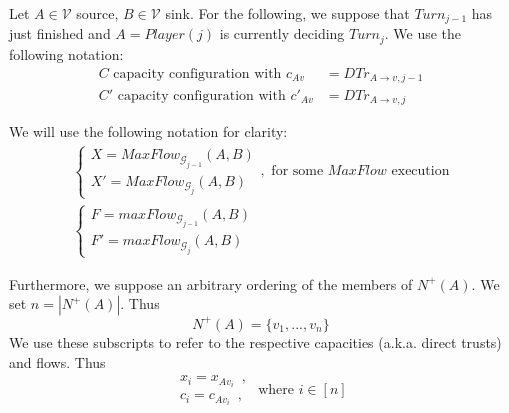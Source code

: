 Let $A \in \mathcal{V}$ source, $B \in \mathcal{V}$ sink. For the following, we suppose that $Turn_{j-1}$ has just finished
and $A = Player\left(j\right)$ is currently deciding $Turn_j$. We use the following notation:
\begin{align*}
   C \mbox{ capacity configuration with } c_{Av} &= DTr_{A \rightarrow v, j-1} \\
   C' \mbox{ capacity configuration with } c'_{Av} &= DTr_{A \rightarrow v, j}
\end{align*}

We will use the following notation for clarity:
\begin{equation*}
\begin{gathered}
  \begin{cases}
    X = MaxFlow_{\mathcal{G}_{j-1}}\left(A, B\right) \\
    X' = MaxFlow_{\mathcal{G}_j}\left(A, B\right)
  \end{cases}, \mbox{ for some } MaxFlow \mbox{ execution} \\
  \begin{cases}
    F = maxFlow_{\mathcal{G}_{j-1}}\left(A, B\right) \\
    F' = maxFlow_{\mathcal{G}_j}\left(A, B\right)
  \end{cases}
\end{gathered}
\end{equation*}

Furthermore, we suppose an arbitrary ordering of the members of $N^{+}\left(A\right)$. We set $n = |N^{+}\left(A\right)|$.
Thus
\begin{equation*}
   N^{+}\left(A\right) = \{v_1, ..., v_n\}
\end{equation*}
We use these subscripts to refer to the respective capacities (a.k.a. direct trusts) and flows. Thus
\begin{equation*}
   \begin{array}{l}
      x_i = x_{Av_i} \enspace, \\
      c_i = c_{Av_i} \enspace,
   \end{array}
   \mbox{ where } i \in [n]
\end{equation*}
